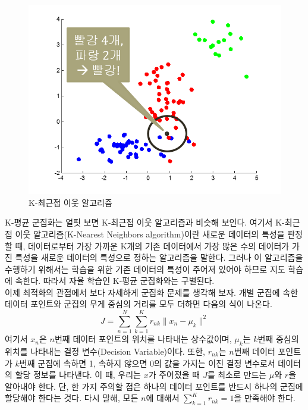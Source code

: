 \documentclass[a4paper]{oblivoir}
\begin{document}
\begin{figure}[ht] \centering 
\includegraphics[scale=0.6]{fig8_3.png} 
\caption{K-최근접 이웃 알고리즘}
\label{fig:8-3}
\end{figure} 

K-평균 군집화는 얼핏 보면 K-최근접 이웃 알고리즘과 비슷해 보인다. 여기서 K-최근접 이웃 알고리즘(K-Nearest Neighbors algorithm)이란 새로운 데이터의 특성을 판정할 때, 데이터로부터 가장 가까운 K개의 기존 데이터에서 가장 많은 수의 데이터가 가진 특성을 새로운 데이터의 특성으로 정하는 알고리즘을 말한다. 그러나 이 알고리즘을 수행하기 위해서는 학습을 위한 기존 데이터의 특성이 주어져 있어야 하므로 지도 학습에 속한다. 따라서 자율 학습인 K-평균 군집화와는 구별된다. \\

이제 최적화의 관점에서 보다 자세하게 군집화 문제를 생각해 보자. 개별 군집에 속한 데이터 포인트와 군집의 무게 중심의 거리를 모두 더하면 다음의 식이 나온다. 
\begin{equation}
J = \sum_{n=1}^{N} \sum_{k=1}^{K} r_{nk} \lVert x_{n} - \mu_{k} \rVert^{2}
\label{eq:8-1}
\end{equation}
여기서 $x_{n}$은 $n$번째 데이터 포인트의 위치를 나타내는 상수값이며, $\mu_{k}$는 $k$번째 중심의 위치를 나타내는 결정 변수(Decision Variable)이다. 또한, $r_{nk}$는 $n$번째 데이터 포인트가 $k$번째 군집에 속하면 1, 속하지 않으면 0의 값을 가지는 이진 결정 변수로서 데이터의 할당 정보를 나타낸다. 이 때, 우리는 $x$가 주어졌을 때 $J$를 최소로 만드는 $\mu$와 $r$을 알아내야 한다. 단, 한 가지 주의할 점은 하나의 데이터 포인트를 반드시 하나의 군집에 할당해야 한다는 것다. 다시 말해, 모든 $n$에 대해서 $\sum_{k=1}^{K} r_{nk}=1$을 만족해야 한다. \\
\end{document}
